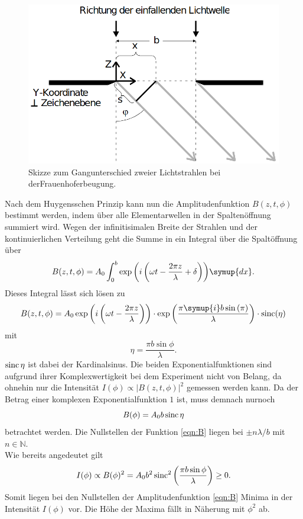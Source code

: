 \begin{figure}[H]
    \centering
    \includegraphics[scale = 0.45]{pictures/frauenhofer2.png}
    \caption{Skizze zum Gangunterschied zweier Lichtstrahlen bei derFrauenhoferbeugung. \cite{AP01}}
    \label{fig:frauenhofer2}
\end{figure}

\noindent
Nach dem Huygensschen Prinzip kann nun die Amplitudenfunktion $B(z,t,\phi)$ bestimmt werden, indem über alle Elementarwellen
in der Spaltenöffnung summiert wird. Wegen der infinitisimalen Breite der Strahlen und der kontinuierlichen Verteilung geht die Summe in ein
Integral über die Spaltöffnung über
\begin{equation*}
    B(z,t,\phi)=A_0\int_0^b{\exp{\left(i\left(\omega t-\frac{2\pi z}{\lambda}+\delta\right)\right)}\symup{dx}}    .
\end{equation*}
Dieses Integral lässt sich lösen zu
\begin{equation*}
    B(z,t,\phi) = A_0\exp{\left(i\left(\omega t-\frac{2 \pi z}{\lambda}\right)\right)}
                \cdot\exp{\left(\frac{\pi \symup{i} b \sin{(\pi)}}{\lambda}\right)}
                \cdot \sinc(\eta)
\end{equation*}
mit
\begin{equation*}
    \eta=\frac{\pi b \sin{\phi}}{\lambda}   .
\end{equation*}
$\operatorname{sinc}{\eta}$ ist dabei der Kardinalsinus. Die beiden Exponentialfunktionen sind aufgrund ihrer Komplexwertigkeit bei dem Experiment nicht von Belang, 
da ohnehin nur die Intensität $I(\phi)\propto |B(z,t,\phi)|^2$ gemessen werden kann. Da der Betrag einer komplexen Exponentialfunktion $\num{1}$ ist, muss
demnach nurnoch
\begin{equation}
    B(\phi)=A_0b\operatorname{sinc}{\eta}
    \label{eqn:B}
\end{equation}
betrachtet werden. Die Nullstellen der Funktion \eqref{eqn:B} liegen bei $\pm n\lambda/b$ mit $n \in \mathbb{N}$.
\\\noindent
Wie bereits angedeutet gilt
\begin{equation}
    I(\phi)\propto B(\phi)^2=
    A_0b^2\operatorname{sinc}^2{\left(\frac{\pi b \sin{\phi}}{\lambda}\right)}
    \geq 0  .
    \label{eqn:intensität1}
\end{equation}
Somit liegen bei den Nullstellen der Amplitudenfunktion \ref{eqn:B} Minima in der Intensität $I(\phi)$ vor. Die Höhe der Maxima fällt in
Näherung mit $\phi^2$ ab.

